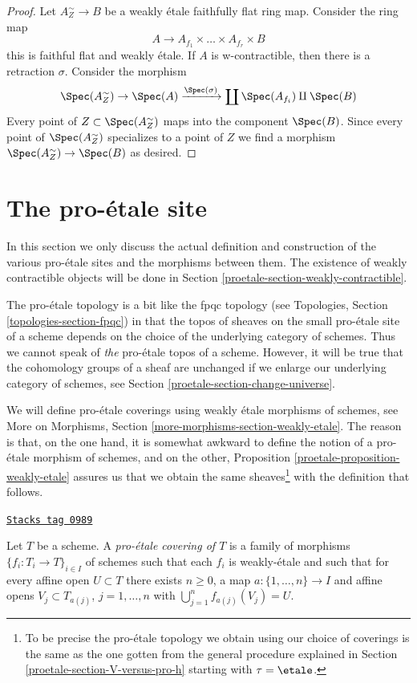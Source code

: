 \begin{proof}
Let $A_Z^\sim \to B$ be a weakly \'etale faithfully flat ring map.
Consider the ring map
$$
A \longrightarrow A_{f_1} \times \ldots \times A_{f_r} \times B
$$
this is faithful flat and weakly \'etale. If $A$ is w-contractible,
then there is a retraction $\sigma$. Consider the morphism
$$
\Spec(A_Z^\sim) \to \Spec(A) \xrightarrow{\Spec(\sigma)}
\coprod \Spec(A_{f_i}) \amalg \Spec(B)
$$
Every point of $Z \subset \Spec(A_Z^\sim)$ maps into the component
$\Spec(B)$. Since every point of $\Spec(A_Z^\sim)$ specializes to a
point of $Z$ we find a morphism $\Spec(A_Z^\sim) \to \Spec(B)$
as desired.
\end{proof}

\section{The pro-\'etale site}
\label{proetale-section-proetale}
In this section we only discuss the actual definition and construction
of the various pro-\'etale sites and the morphisms between them. The
existence of weakly contractible objects will be done in
Section \ref{proetale-section-weakly-contractible}.

\medskip\noindent
The pro-\'etale topology is a bit like
the fpqc topology (see Topologies, Section \ref{topologies-section-fpqc})
in that the topos of sheaves on the small pro-\'etale site of a scheme
depends on the choice of the underlying category of schemes. Thus we cannot
speak of {\it the} pro-\'etale topos of a scheme. However, it will be
true that the cohomology groups of a sheaf are unchanged if we enlarge
our underlying category of schemes, see Section \ref{proetale-section-change-universe}.

\medskip\noindent
We will define pro-\'etale coverings using weakly \'etale morphisms of schemes,
see More on Morphisms, Section \ref{more-morphisms-section-weakly-etale}.
The reason is that, on the one hand, it is somewhat awkward to define
the notion of a pro-\'etale morphism of schemes, and on the other,
Proposition \ref{proetale-proposition-weakly-etale}
assures us that we obtain the same sheaves\footnote{To be precise
the pro-\'etale topology we obtain using our choice of coverings
is the same as the one gotten from the general procedure explained
in Section \ref{proetale-section-V-versus-pro-h} starting with $\tau = \etale$.}
with the definition that follows.

\begin{definition}
\label{proetale-definition-fpqc-covering}
\href{https://stacks.math.columbia.edu/tag/0989}{\texttt{Stacks tag 0989}}

Let $T$ be a scheme. A {\it pro-\'etale covering of $T$} is a family
of morphisms $\{f_i : T_i \to T\}_{i \in I}$ of schemes
such that each $f_i$ is weakly-\'etale and such that for every affine open
$U \subset T$ there exists $n \geq 0$, a map
$a : \{1, \ldots, n\} \to I$ and affine opens
$V_j \subset T_{a(j)}$, $j = 1, \ldots, n$
with $\bigcup_{j = 1}^n f_{a(j)}(V_j) = U$.
\end{definition}

